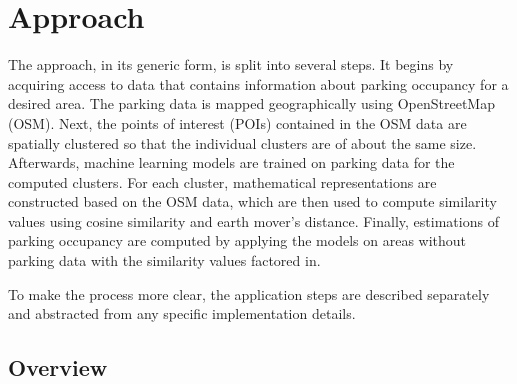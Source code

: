 	\section{Approach}
	The approach, in its generic form, is split into several steps. It begins by acquiring access to data that contains information about parking occupancy for a desired area. The parking data is mapped geographically using OpenStreetMap (OSM).
	Next, the points of interest (POIs) contained in the OSM data are spatially clustered so that the individual clusters are of about the same size. Afterwards, machine learning models are trained on parking data for the computed clusters. For each cluster, mathematical representations are constructed based on the OSM data, which are then used to compute similarity values using cosine similarity and earth mover's distance. Finally, estimations of parking occupancy are computed by applying the models on areas without parking data with the similarity values factored in.   
	
	To make the process more clear, the application steps are described separately and abstracted from any specific implementation details.
	
	\subsection{Overview}	

